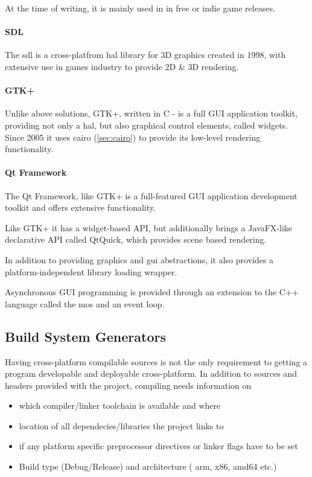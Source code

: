 At the time of writing, it is mainly used in in free or indie game releases.

\paragraph{SDL}
The \gls{sdl} is a cross-platfrom \gls{hal} library for 3D graphics created in 1998, with extensive use in games industry to provide 2D \& 3D rendering.

\paragraph{GTK+}
Unlike above solutions, GTK+, written in C - is a full GUI application toolkit, providing not only a \gls{hal}, but also graphical control elements, called widgets. Since 2005 it uses cairo (\ref{sec:cairo}) to provide its low-level rendering functionality.

\paragraph{Qt Framework}
The Qt Framework, like GTK+ is a full-featured GUI application development toolkit and offers extensive functionality.

Like GTK+ it has a widget-based API, but additionally brings a JavaFX-like declarative API called QtQuick, which provides scene based rendering.

In addition to providing graphics and \gls{gui} abstractions, it also provides a platform-independent library loading wrapper.

Asynchronous GUI programming is provided through an extension to the C++ language called the \gls{mos} and an event loop.

\subsection{Build System Generators}
\label{sec:resMakefileGen}
Having cross-platform compilable sources is not the only requirement to getting a program developable and deployable cross-platform.
In addition to sources and headers provided with the project, compiling needs information on 
\begin{itemize}
	\item which compiler/linker toolchain is available and where
	\item location of all dependecies/libraries the project links to
	\item if any platform specific preprocessor directives or linker flags have to be set
	\item Build type (Debug/Release) and architecture ( arm, x86, amd64 etc.)
\end{itemize}

